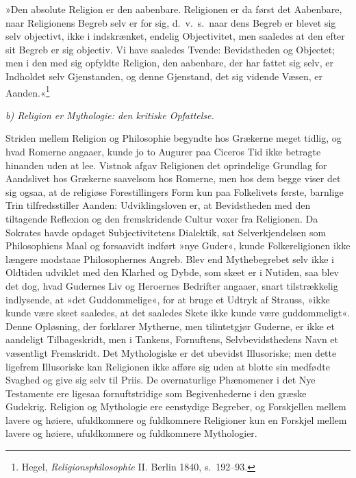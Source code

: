 \documentclass[12pt,a4paper]{article}
\begin{document}
»Den absolute Religion er den aabenbare. Religionen er da først
det Aabenbare, naar Religionens Begreb selv er for sig, d.\ v.\ s.\
naar dens Begreb er blevet sig selv objectivt, ikke i
indskrænket, endelig Objectivitet, men saaledes at den efter sit
Begreb er sig objectiv. Vi have saaledes Tvende: Bevidstheden og
Objectet; men i den med sig opfyldte Religion, den aabenbare,
der har fattet sig selv, er Indholdet selv Gjenstanden, og denne
Gjenstand, det sig vidende Væsen, er Aanden.«\footnote{Hegel,
\textit{Religionsphilosophie} II. Berlin 1840, s.\ 192--93.}

\medskip

\noindent\textit{b) Religion er Mythologie: den kritiske Opfattelse.}

\medskip

Striden mellem Religion og Philosophie begyndte hos Grækerne
meget tidlig, og hvad Romerne angaaer, kunde jo to Augurer paa
Ciceros Tid ikke betragte hinanden uden at lee. Vistnok afgav
Religionen det oprindelige Grundlag for Aandslivet hos Grækerne
saavelsom hos Romerne, men hos dem begge viser det sig ogsaa,
at de religiøse Forestillingers Form kun paa Folkelivets første,
barnlige Trin tilfredsstiller Aanden: Udviklingsloven er, at
Bevidstheden med den tiltagende Reflexion og den fremskridende
Cultur voxer fra Religionen. Da Sokrates havde opdaget
Subjectivitetens Dialektik, sat Selverkjendelsen som Philosophiens
Maal og forsaavidt indført »nye Guder«, kunde Folkereligionen
ikke længere modstaae Philosophernes Angreb. Blev end
Mythebegrebet selv ikke i Oldtiden udviklet med den Klarhed og
Dybde, som skeet er i Nutiden, saa blev det dog, hvad Gudernes
Liv og Heroernes Bedrifter angaaer, snart tilstrækkelig
indlysende, at »det Guddommelige«, for at bruge et Udtryk af
Strauss, »ikke kunde være skeet saaledes, at det saaledes Skete
ikke kunde være guddommeligt«. Denne Opløsning, der forklarer
Mytherne, men tilintetgjør Guderne, er ikke et aandeligt
Tilbageskridt, men i Tankens, Fornuftens, Selvbevidsthedens Navn
et væsentligt Fremskridt. Det Mythologiske er det ubevidst
Illusoriske; men dette ligefrem Illusoriske kan Religionen ikke
afføre sig uden at blotte sin medfødte Svaghed og give sig selv
til Priis. De overnaturlige Phænomener i det Nye Testamente ere
ligesaa fornuftstridige som Begivenhederne i den græske
Gudekrig. Religion og Mythologie ere eenstydige Begreber, og
Forskjellen mellem lavere og høiere, ufuldkomnere og fuldkomnere
Religioner kun en Forskjel mellem lavere og høiere, ufuldkomnere
og fuldkomnere Mythologier.
\end{document}
